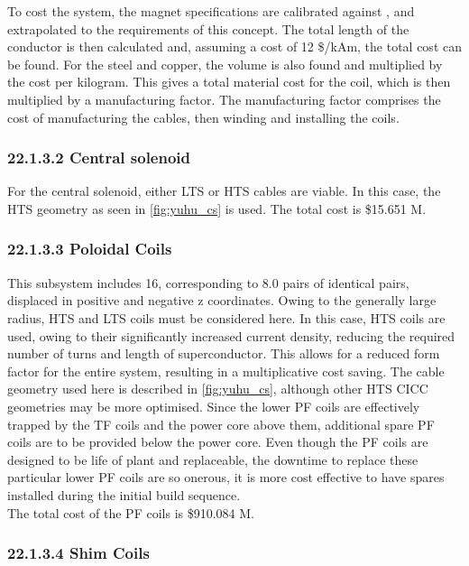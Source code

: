 To cost the system, the magnet specifications are calibrated against \cite{Menard2016}, and extrapolated to the requirements of this concept. The total length of the conductor is then calculated and, assuming a cost of 12 \$/kAm, the total cost can be found. For the steel and copper, the volume is also found and multiplied by the cost per kilogram. This gives a total material cost for the coil, which is then multiplied by a manufacturing factor. The manufacturing factor comprises the cost of manufacturing the cables, then winding and installing the coils. \\

\subsubsection*{22.1.3.2 Central solenoid}

For the central solenoid, either LTS or HTS cables are viable. In this case, the HTS geometry as seen in \ref{fig:yuhu_cs} is used. The total cost is \$15.651 M.

\subsubsection*{22.1.3.3 Poloidal Coils}

This subsystem includes 16, corresponding to 8.0 pairs of identical pairs, displaced in positive and negative z coordinates. Owing to the generally large radius, HTS and LTS coils must be considered here. In this case, HTS coils are used, owing to their significantly increased current density, reducing the required number of turns and length of superconductor. This allows for a reduced form factor for the entire system, resulting in a multiplicative cost saving. The cable geometry used here is described in \ref{fig:yuhu_cs}, although other HTS CICC geometries may be more optimised.
Since the lower PF coils are effectively trapped by the TF coils and the power core above them, additional spare PF coils are to be provided below the power core. Even though the PF coils are designed to be life of plant and replaceable, the downtime to replace these particular lower PF coils are so onerous, it is more cost effective to have spares installed during the initial build sequence.  \\

The total cost of the PF coils is \$910.084 M. \\

\subsubsection*{22.1.3.4 Shim Coils}


